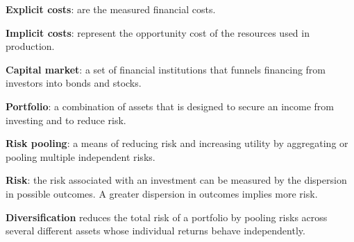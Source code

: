 \begin{keyterms}
\textbf{Explicit costs}: are the measured financial costs.

\textbf{Implicit costs}: represent the opportunity cost of the resources used in production.

\textbf{Capital market}: a set of financial institutions that funnels financing from investors into bonds and stocks.

\textbf{Portfolio}: a combination of assets that is designed to secure an income from investing and to reduce risk.

\textbf{Risk pooling}: a means of reducing risk and increasing utility by aggregating or pooling multiple independent risks.

\textbf{Risk}: the risk associated with an investment can be measured by the dispersion in possible outcomes. A greater dispersion in outcomes implies more risk.

\textbf{Diversification} reduces the total risk of a portfolio by pooling risks across several different assets whose individual returns behave independently.
\end{keyterms}